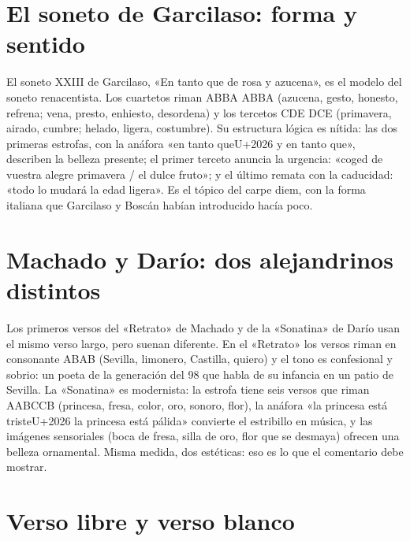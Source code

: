 \documentclass{book}
\begin{document}

\section{El soneto de Garcilaso: forma y sentido}

El soneto XXIII de Garcilaso, «En tanto que de rosa y azucena», es el modelo del soneto renacentista. Los cuartetos riman ABBA ABBA (azucena, gesto, honesto, refrena; vena, presto, enhiesto, desordena) y los tercetos CDE DCE (primavera, airado, cumbre; helado, ligera, costumbre). Su estructura lógica es nítida: las dos primeras estrofas, con la anáfora «en tanto que{U+2026} y en tanto que», describen la belleza presente; el primer terceto anuncia la urgencia: «coged de vuestra alegre primavera / el dulce fruto»; y el último remata con la caducidad: «todo lo mudará la edad ligera». Es el tópico del carpe diem, con la forma italiana que Garcilaso y Boscán habían introducido hacía poco.


\section{Machado y Darío: dos alejandrinos distintos}

Los primeros versos del «Retrato» de Machado y de la «Sonatina» de Darío usan el mismo verso largo, pero suenan diferente. En el «Retrato» los versos riman en consonante ABAB (Sevilla, limonero, Castilla, quiero) y el tono es confesional y sobrio: un poeta de la generación del 98 que habla de su infancia en un patio de Sevilla. La «Sonatina» es modernista: la estrofa tiene seis versos que riman AABCCB (princesa, fresa, color, oro, sonoro, flor), la anáfora «la princesa está triste{U+2026} la princesa está pálida» convierte el estribillo en música, y las imágenes sensoriales (boca de fresa, silla de oro, flor que se desmaya) ofrecen una belleza ornamental. Misma medida, dos estéticas: eso es lo que el comentario debe mostrar.


\section{Verso libre y verso blanco}
\end{document}
